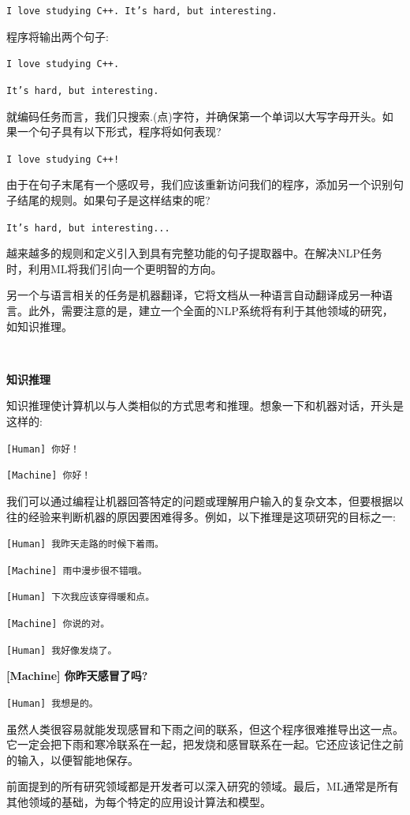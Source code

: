 \texttt{I love studying C++. It's hard, but interesting.} \par

程序将输出两个句子: \par

\texttt{I love studying C++.} \par
\texttt{It's hard, but interesting.} \par

就编码任务而言，我们只搜索.(点)字符，并确保第一个单词以大写字母开头。如果一个句子具有以下形式，程序将如何表现? \par

\texttt{I love studying C++!} \par

由于在句子末尾有一个感叹号，我们应该重新访问我们的程序，添加另一个识别句子结尾的规则。如果句子是这样结束的呢? \par

\texttt{It's hard, but interesting...} \par

越来越多的规则和定义引入到具有完整功能的句子提取器中。在解决NLP任务时，利用ML将我们引向一个更明智的方向。 \par
另一个与语言相关的任务是机器翻译，它将文档从一种语言自动翻译成另一种语言。此外，需要注意的是，建立一个全面的NLP系统将有利于其他领域的研究，如知识推理。 \par

\noindent\textbf{}\ \par
\textbf{知识推理} \ \par
知识推理使计算机以与人类相似的方式思考和推理。想象一下和机器对话，开头是这样的: \par
\par
\texttt{[Human] 你好！} \par
\texttt{[Machine] 你好！} \par
\par
我们可以通过编程让机器回答特定的问题或理解用户输入的复杂文本，但要根据以往的经验来判断机器的原因要困难得多。例如，以下推理是这项研究的目标之一: \par
\par
\texttt{[Human] 我昨天走路的时候下着雨。} \par
\texttt{[Machine] 雨中漫步很不错哦。} \par
\texttt{[Human] 下次我应该穿得暖和点。} \par
\texttt{[Machine] 你说的对。} \par
\texttt{[Human] 我好像发烧了。} \par
\textbf{[Machine] 你昨天感冒了吗?} \par
\texttt{[Human] 我想是的。} \par
\par
虽然人类很容易就能发现感冒和下雨之间的联系，但这个程序很难推导出这一点。它一定会把下雨和寒冷联系在一起，把发烧和感冒联系在一起。它还应该记住之前的输入，以便智能地保存。 \par
前面提到的所有研究领域都是开发者可以深入研究的领域。最后，ML通常是所有其他领域的基础，为每个特定的应用设计算法和模型。 \par

